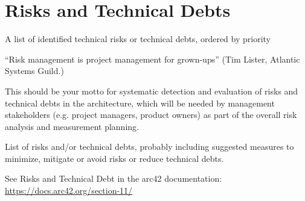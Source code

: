 \section{Risks and Technical Debts}

A list of identified technical risks or technical debts, ordered by priority

“Risk management is project management for grown-ups” (Tim Lister, Atlantic Systems Guild.)

This should be your motto for systematic detection and evaluation of risks and technical debts in the architecture, which will be needed by management stakeholders (e.g. project managers, product owners) as part of the overall risk analysis and measurement planning.

List of risks and/or technical debts, probably including suggested measures to minimize, mitigate or avoid risks or reduce technical debts.

See Risks and Technical Debt in the arc42 documentation:
\href{https://docs.arc42.org/section-11/}{https://docs.arc42.org/section-11/}

